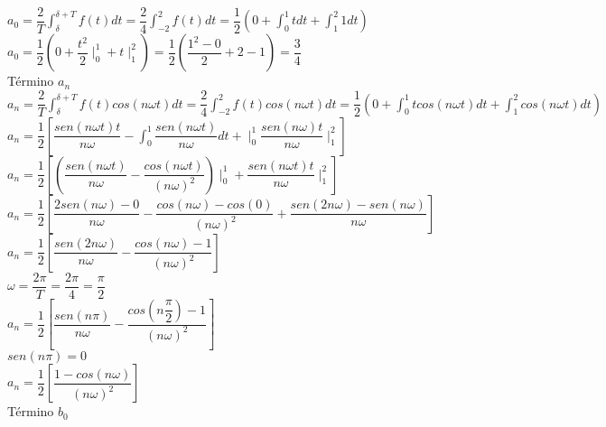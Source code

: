 \documentclass[10pt,a4paper]{article}
\begin{document}
\begin{center}
$\displaystyle{a_0 = \dfrac{2}{T} \int_{\delta}^{\delta + T} f(t) dt = \dfrac{2}{4} \int_{-2}^{2} f(t) dt = \dfrac{1}{2} (0 + \int_{0}^{1} t dt + \int_{1}^{2} 1 dt)}$\\
$\displaystyle{a_0 = \dfrac{1}{2} (0 + \dfrac{t^2}{2} \mid^1_0  +t \mid^2_1 ) = \dfrac{1}{2} ( \dfrac{1^2 - 0}{2} +2-1)  = \dfrac{3}{4}}$\\
Término $a_n$\\
$\displaystyle{a_n = \dfrac{2}{T} \int_{\delta}^{\delta + T} f(t) cos (n \omega t)dt = \dfrac{2}{4} \int_{-2}^{2} f(t) cos (n \omega t)dt = \dfrac{1}{2} (0 + \int_{0}^{1} t cos (n \omega t) dt + \int_{1}^{2} cos (n \omega t) dt)}$\\
$\displaystyle{a_n = \dfrac{1}{2} [\dfrac{sen(n \omega t) t}{n \omega} - \int_{0}^{1} \dfrac{sen(n \omega t)}{n \omega} dt + \mid_{0}^{1} \dfrac{sen(n \omega) t}{n \omega} \mid_{1}^{2}]}$\\
$\displaystyle{a_n = \dfrac{1}{2} [(\dfrac{sen(n \omega t) }{n \omega} - \dfrac{cos(n \omega t)}{(n \omega)^2}   )\mid_{0}^{1} +  \dfrac{sen(n \omega t) t}{n \omega} \mid_{1}^{2}]}$\\
$\displaystyle{a_n = \dfrac{1}{2} [\dfrac{2 sen(n \omega) - 0 }{n \omega} - \dfrac{cos(n \omega) - cos(0)}{(n \omega)^2} + \dfrac{sen(2 n \omega ) -sen(n \omega) }{n \omega} ]}$\\
$\displaystyle{a_n = \dfrac{1}{2} [\dfrac{sen(2 n \omega)}{n \omega} - \dfrac{cos(n \omega) - 1}{(n \omega)^2}]}$\\
$\omega = \dfrac{2 \pi}{T} = \dfrac{2 \pi}{4} = \dfrac{\pi}{2} $\\
$\displaystyle{a_n = \dfrac{1}{2} [\dfrac{sen( n \pi)}{n \omega} - \dfrac{cos(n \dfrac{\pi}{2}) - 1}{(n \omega)^2}]}$\\
$sen (n \pi) = 0$\\
$\displaystyle{a_n = \dfrac{1}{2} [  \dfrac{1 - cos(n \omega)}{(n \omega)^2}]}$\\
Término $b_0$\\


\end{center}
\end{document}

